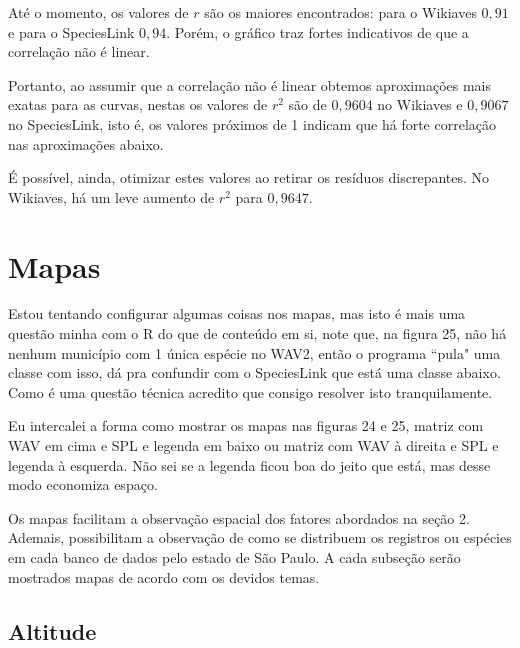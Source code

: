 \documentclass[12pt]{extarticle}
\newcommand{\asp}[1]{``#1"}
\newenvironment{resposta}{ \color{mygray}}{}
\begin{document}
\begin{resposta}
Até o momento, os valores de $r$ são os maiores encontrados: para o Wikiaves $0,91$ e para o SpeciesLink $0,94$. Porém, o gráfico traz fortes indicativos de que a correlação não é linear.

Portanto, ao assumir que a correlação não é linear obtemos aproximações mais exatas para as curvas, nestas os valores de $r^2$ são de $0,9604$ no Wikiaves e $0,9067$ no SpeciesLink, isto é, os valores próximos de 1 indicam que há forte correlação nas aproximações abaixo.

É possível, ainda, otimizar estes valores ao retirar os resíduos discrepantes. No Wikiaves, há um leve aumento de $r^2$ para $0,9647$.


\end{resposta}


\section{Mapas}

\hrulefill

Estou tentando configurar algumas coisas nos mapas, mas isto é mais uma questão minha com o R do que de conteúdo em si, note que, na figura 25, não há nenhum município com 1 única espécie no WAV2, então o programa \asp{pula} uma classe com isso, dá pra confundir com o SpeciesLink que está uma classe abaixo. Como é uma questão técnica acredito que consigo resolver isto tranquilamente.

Eu intercalei a forma como mostrar os mapas nas figuras 24 e 25, matriz com WAV em cima e SPL e legenda em baixo ou matriz com WAV à direita e SPL e legenda à esquerda. Não sei se a legenda ficou boa do jeito que está, mas desse modo economiza espaço.

\hrulefill

\begin{resposta}
Os mapas facilitam a observação espacial dos fatores abordados na seção 2. Ademais, possibilitam a observação de como se distribuem os registros ou espécies em cada banco de dados pelo estado de São Paulo. A cada subseção serão mostrados mapas de acordo com os devidos temas.
\end{resposta}

\subsection{Altitude}
\end{document}
